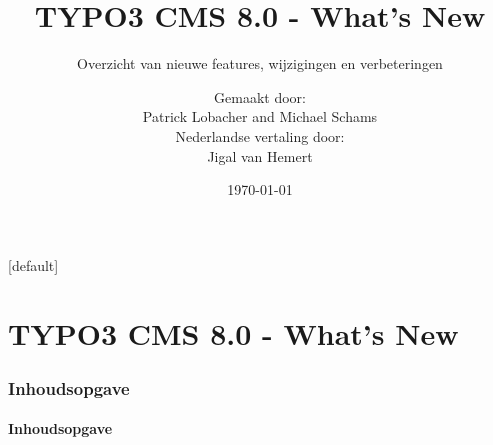 \documentclass[t]{beamer}
\title{TYPO3 CMS 8.0 - What's New}
\subtitle{Overzicht van nieuwe features, wijzigingen en verbeteringen}
\author{
	\centerline{Gemaakt door:}
	\centerline{Patrick Lobacher and Michael Schams}
	\vspace{0.4cm}
	\centerline{Nederlandse vertaling door:}
	\centerline{Jigal van Hemert}
}
\date{\today}
\begin{document}
\sharefont


\begingroup
	[default]
	\begin{frame}
		\titlepage
	\end{frame}
\endgroup


\section*{TYPO3 CMS 8.0 - What's New}
\begin{frame}[fragile]
	\frametitle{Inhoudsopgave}
	\framesubtitle{Inhoudsopgave}

	\tableofcontents

\end{frame}










\end{document}

